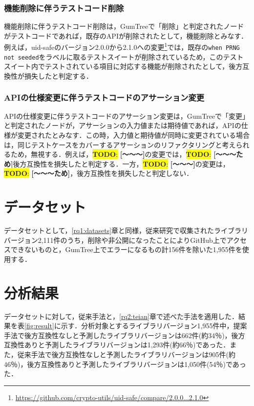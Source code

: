 \documentclass[11pt,dvipdfmx]{jreport}
\newcommand{\todo}[1]{\colorbox{yellow}{{\bf TODO}:}{\color{red} {\textbf{[#1]}}}}
\begin{document}
\subsubsection{機能削除に伴うテストコード削除}
機能削除に伴うテストコード削除は，GumTreeで「削除」と判定されたノードがテストコードであれば，既存のAPIが削除されたとして，機能削除とみなす．例えば，uid-safeのバージョン2.0.0から2.1.0への変更\footnote{\url{https://github.com/crypto-utils/uid-safe/compare/2.0.0...2.1.0}}では，既存の{\verb|when PRNG not seeded|}をラベルに取るテストスイートが削除されているため，このテストスイート内でテストされている項目に対応する機能が削除されたとして，後方互換性が損失したと判定する．

\subsubsection{APIの仕様変更に伴うテストコードのアサーション変更}
APIの仕様変更に伴うテストコードのアサーション変更は，GumTreeで「変更」と判定されたノードが，アサーションの入力値または期待値であれば，APIの仕様が変更されたとみなす．この時，入力値と期待値が同時に変更されている場合は，同じテストケースをカバーするアサーションのリファクタリングと考えられるため，無視する．例えば，\todo{〜〜〜}の変更では，\todo{〜〜〜ため}後方互換性を損失したと判定する．一方，\todo{〜〜〜}の変更は，\todo{〜〜〜ため}，後方互換性を損失したと判定しない．

\section{データセット}
データセットとして，\ref{rq1:datasets}章と同様，従来研究\cite{matsuda}で収集されたライブラリバージョン2,111件のうち，削除や非公開になったことによりGitHub上でアクセスできないものと，GumTree上でエラーになるもの計156件を除いた1,955件を使用する．

\section{分析結果}

データセットに対して，従来手法と，\ref{rq2:teian}章で述べた手法を適用した．結果を表\ref{fig:result}に示す．分析対象とするライブラリバージョン1,955件中，提案手法で後方互換性なしと予測したライブラリバージョンは662件(約34％)，後方互換性ありと予測したライブラリバージョンは1,293件(約66％)であった．また，従来手法で後方互換性なしと予測したライブラリバージョンは905件(約46％)，後方互換性ありと予測したライブラリバージョンは1,050件(54％)であった．
\end{document}
